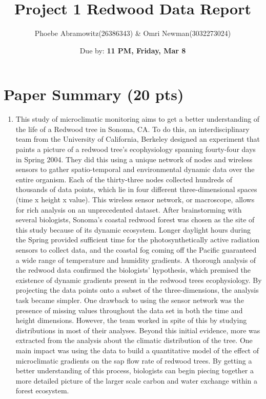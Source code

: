 \documentclass[11pt]{article}
\title{Project 1 Redwood Data Report}
\author{Phoebe Abramowitz(26386343) & Omri Newman(3032273024)}
\date{Due by: \textbf{11 PM, Friday, Mar 8}}
\begin{document}


\maketitle

\section{Paper Summary (20 pts)}

\begin{enumerate}[label=(\alph*)]
\item This study of microclimatic monitoring aims to get a better understanding of the life of a Redwood tree in Sonoma, CA. To do this, an interdisciplinary team from the University of California, Berkeley designed an experiment that paints a picture of a redwood tree’s ecophysiology spanning fourty-four days in Spring 2004. They did this using a unique network of nodes and wireless sensors to gather spatio-temporal and environmental dynamic data over the entire organism. Each of the thirty-three nodes collected hundreds of thousands of data points, which lie in four different three-dimensional spaces (time x height x value). This wireless sensor network, or macroscope, allows for rich analysis on an unprecedented dataset.
After brainstorming with several biologists, Sonoma’s coastal redwood forest was chosen as the site of this study because of its dynamic ecosystem. Longer daylight hours during the Spring provided sufficient time for the photosynthetically active radiation sensors to collect data, and the coastal fog coming off the Pacific guaranteed a wide range of temperature and humidity gradients.
A thorough analysis of the redwood data confirmed the biologists’ hypothesis, which premised the existence of dynamic gradients present in the redwood trees ecophysiology. By projecting the data points onto a subset of the three-dimensions, the analysis task became simpler.
One drawback to using the sensor network was the presence of missing values throughout the data set in both the time and height dimensions. However, the team worked in spite of this by studying distributions in most of their analyses.  Beyond this initial evidence, more was extracted from the analysis about the climatic distribution of the tree. One main impact was using the data to build a quantitative model of the effect of microclimatic gradients on the sap flow rate of redwood trees. By getting a better understanding of this process, biologists can begin piecing together a more detailed picture of the larger scale carbon and water exchange within a forest ecosystem.


\end{enumerate}
\end{document}

